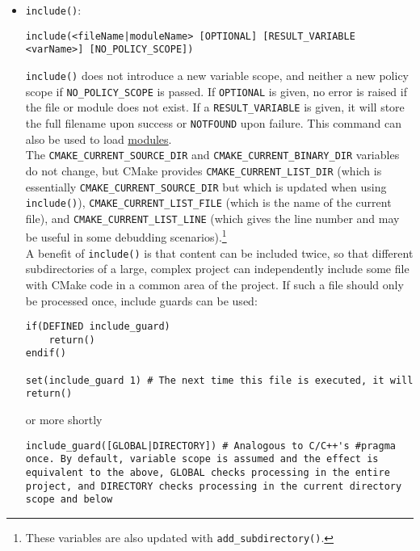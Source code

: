 \documentclass[8pt, table, xcdraw]{article}%
\begin{document}
\begin{itemize}
\item \lstinline{include()}:

\begin{lstlisting}
include(<fileName|moduleName> [OPTIONAL] [RESULT_VARIABLE <varName>] [NO_POLICY_SCOPE])
\end{lstlisting}

\lstinline{include()} does not introduce a new variable scope, and neither a new policy scope if \lstinline{NO_POLICY_SCOPE} is passed. If \lstinline{OPTIONAL} is given, no error is raised if the file or module does not exist. If a \lstinline{RESULT_VARIABLE} is given, it will store the full filename upon success or \lstinline{NOTFOUND} upon failure. This command can also be used to load \hyperref[modules]{modules}.\\
The \lstinline{CMAKE_CURRENT_SOURCE_DIR} and \lstinline{CMAKE_CURRENT_BINARY_DIR} variables do not change, but CMake provides \lstinline{CMAKE_CURRENT_LIST_DIR} (which is essentially \lstinline{CMAKE_CURRENT_SOURCE_DIR} but which is updated when using \lstinline{include()}), \lstinline{CMAKE_CURRENT_LIST_FILE} (which is the name of the current file), and \lstinline{CMAKE_CURRENT_LIST_LINE} (which gives the line number and may be useful in some debudding scenarios).\footnote{These variables are also updated with \lstinline{add_subdirectory()}.}\\
A benefit of \lstinline{include()} is that content can be included twice, so that different subdirectories of a large, complex project can independently include some file with CMake code in a common area of the project. If such a file should only be processed once, include guards can be used:

\begin{lstlisting}
if(DEFINED include_guard)
    return()
endif()

set(include_guard 1) # The next time this file is executed, it will return()
\end{lstlisting}

or more shortly

\begin{lstlisting}
include_guard([GLOBAL|DIRECTORY]) # Analogous to C/C++'s #pragma once. By default, variable scope is assumed and the effect is equivalent to the above, GLOBAL checks processing in the entire project, and DIRECTORY checks processing in the current directory scope and below
\end{lstlisting}
\end{itemize}
\end{document}
